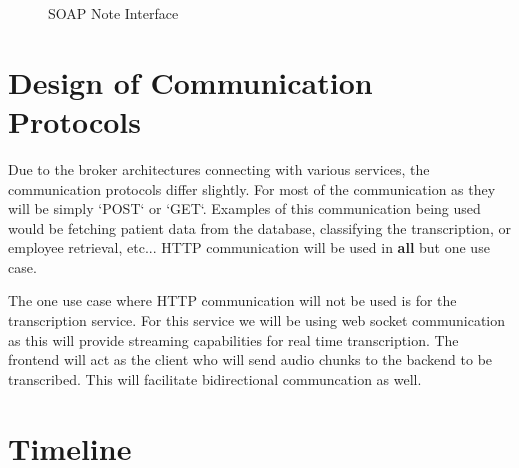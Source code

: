\documentclass[12pt, titlepage]{article}
\begin{document}
\begin{figure}[h!]
    \centering
    \caption{SOAP Note Interface}
    \label{fig:healthcare-interface-3}
\end{figure}


\section{Design of Communication Protocols}

Due to the broker architectures connecting with various services, the communication protocols differ slightly. For most of the communication as they will be simply `POST` or `GET`. Examples of this communication being used would be fetching patient data from the database, classifying the transcription, or employee retrieval, etc... HTTP communication will be used in \textbf{all} but one use case.

The one use case where HTTP communication will not be used is for the transcription service. For this service we will be using web socket communication as this will provide streaming capabilities for real time transcription. The frontend will act as the client who will send audio chunks to the backend to be transcribed. This will facilitate bidirectional communcation as well.


\section{Timeline}
\end{document}
